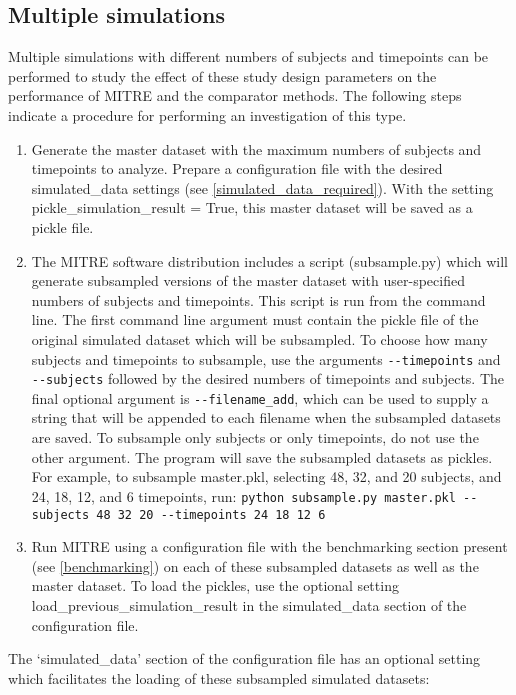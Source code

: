 \documentclass[12pt]{report}
\begin{document}
\subsection{Multiple simulations}
Multiple simulations with different numbers of subjects and timepoints can be performed to study the effect of these study design parameters on the performance of MITRE and the comparator methods. The following steps indicate a procedure for performing an investigation of this type.
\begin{enumerate}
  \item Generate the master dataset with the maximum numbers of subjects and timepoints to analyze. Prepare a configuration file with the desired simulated\_data settings (see \ref{simulated_data_required}). With the setting pickle\_simulation\_result = True, this master dataset will be saved as a pickle file.
  \item The MITRE software distribution includes a script (subsample.py) which will generate subsampled versions of the master dataset with user-specified numbers of subjects and timepoints. This script is run from the command line. The first command line argument must contain the pickle file of the original simulated dataset which will be subsampled. To choose how many subjects and timepoints to subsample, use the arguments \texttt{-{}-timepoints} and \texttt{-{}-subjects} followed by the desired numbers of timepoints and subjects. The final optional argument is \texttt{-{}-filename\_add}, which can be used to supply a string that will be appended to each filename when the subsampled datasets are saved. To subsample only subjects or only timepoints, do not use the other argument. The program will save the subsampled datasets as pickles. For example, to subsample master.pkl, selecting 48, 32, and 20 subjects, and 24, 18, 12, and 6 timepoints, run: \texttt{python subsample.py master.pkl -{}-subjects 48 32 20 -{}-timepoints 24 18 12 6}
  \item Run MITRE using a configuration file with the benchmarking section present (see \ref{benchmarking}) on each of these subsampled datasets as well as the master dataset. To load the pickles, use the optional setting load\_previous\_simulation\_result in the simulated\_data section of the configuration file.
\end{enumerate}
The `simulated\_data' section of the configuration file has an optional setting which facilitates the loading of these subsampled simulated datasets:
\end{document}
